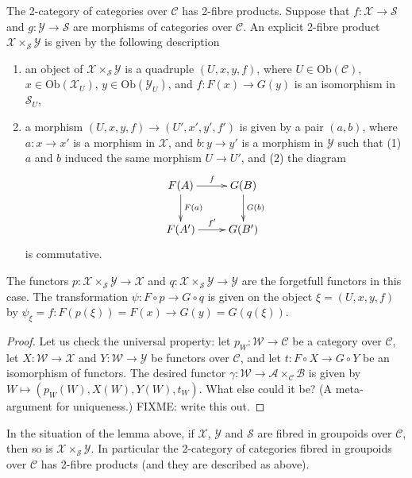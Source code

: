 \begin{lemma}
\label{lemma-2-product-categories-over-C} The 2-category of categories
over $\mathcal{C}$ has 2-fibre products. Suppose that
$f : \mathcal{X} \to \mathcal{S}$ and
$g : \mathcal{Y} \to \mathcal{S}$ are morphisms of categories over
$\mathcal{C}$. An explicit 2-fibre product
$\mathcal{X} \times_\mathcal{S}\mathcal{Y}$ is given by the following
description
\begin{enumerate}
\item an object of $\mathcal{X}\times_\mathcal{S} \mathcal{Y}$ is a quadruple
$(U,x,y,f)$, where $U \in \text{Ob}(\mathcal{C})$,
$x\in \text{Ob}(\mathcal{X}_U)$, $y\in \text{Ob}(\mathcal{Y}_U)$,
and $f : F(x) \to G(y)$ is an isomorphism in $\mathcal{S}_U$,
\item a morphism $(U,x,y,f) \to (U',x',y', f')$ is given by a pair $(a,b)$,
where $a : x \to x'$ is a morphism in $\mathcal{X}$, and $b : y \to y'$ is a
morphism in $\mathcal{Y}$ such that (1) $a$ and $b$ induced the same
morphism $U \to U'$, and (2) the diagram 
$$
\xymatrix{
F(A) \ar[r]^f \ar[d]^{F(a)} & G(B) \ar[d]^{G(b)} \\
F(A') \ar[r]^{f'} & G(B')
}
$$
is commutative.
\end{enumerate}
The functors $p : \mathcal{X}\times_\mathcal{S}\mathcal{Y} \to \mathcal{X}$
and $q : \mathcal{X}\times_\mathcal{S}\mathcal{Y} \to \mathcal{Y}$ are the
forgetfull functors in this case. The transformation $\psi : F \circ p \to
G \circ q$ is given on the object $\xi = (U,x,y,f)$ by
$\psi_\xi = f : F(p(\xi)) = F(x) \to G(y) = G(q(\xi))$.
\end{lemma}

\begin{proof}
Let us check the universal property: let $p_W : \mathcal{W}\to \mathcal{C}$
be a category over $\mathcal{C}$, let $X : \mathcal{W} \to \mathcal{X}$ and
$Y : \mathcal{W} \to \mathcal{Y}$ be functors over $\mathcal{C}$, and let
$t : F \circ X \to G \circ Y$ be an isomorphism of functors.
The desired functor
$\gamma : \mathcal{W} \to \mathcal{A}\times_\mathcal{C}\mathcal{B}$
is given by $W \mapsto (p_W(W), X(W), Y(W), t_W)$. What else could it be? 
(A meta-argument for uniqueness.) FIXME: write this out.
\end{proof}

\begin{lemma}
\label{lemma-2-product-fibred-categories}
In the situation of the lemma above, if $\mathcal{X}$, $\mathcal{Y}$ and 
$\mathcal{S}$ are fibred in groupoids over $\mathcal{C}$, then so is
$\mathcal{X}\times_\mathcal{S}\mathcal{Y}$. In particular the 2-category
of categories fibred in groupoids over $\mathcal{C}$ has 2-fibre products
(and they are described as above).
\end{lemma}

